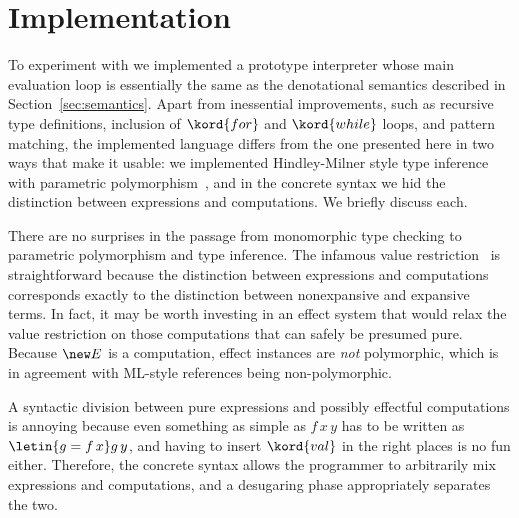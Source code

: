 \section{Implementation}
\label{sec:implementation}

To experiment with \eff we implemented a prototype interpreter whose main evaluation loop
is essentially the same as the denotational semantics described in
Section~\ref{sec:semantics}. Apart from inessential improvements, such as recursive type
definitions, inclusion of $\kord{for}$ and $\kord{while}$ loops, and pattern matching, the
implemented language differs from the one presented here in two ways that make it usable:
we implemented Hindley-Milner style type inference with parametric
polymorphism~\cite{milner78atheory}, and in the concrete syntax we hid the distinction
between expressions and computations. We briefly discuss each.

There are no surprises in the passage from monomorphic type checking to parametric
polymorphism and type inference. The infamous value
restriction~\cite{wright95simpleimperative} is straightforward because the distinction
between expressions and computations corresponds exactly to the distinction between
nonexpansive and expansive terms. In fact, it may be worth investing in an effect system
that would relax the value restriction on those computations
that can safely be presumed pure. Because $\new E$ is a computation, effect instances are
\emph{not} polymorphic, which is in agreement with ML-style references being
non-polymorphic.

A syntactic division between pure expressions and possibly effectful computations is
annoying because even something as simple as $f \, x \, y$ has to be written as
$\letin{g = f\, x} g \, y$, and having to insert $\kord{val}$ in the right places is no
fun either. Therefore, the concrete syntax allows the programmer to arbitrarily mix expressions
and computations, and a desugaring phase appropriately separates the two.

